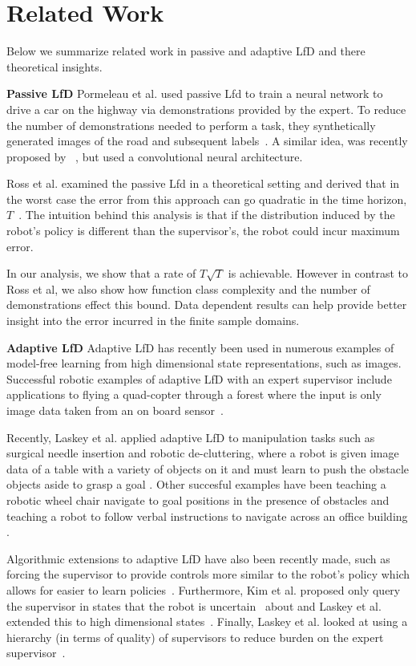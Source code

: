 \documentclass[10pt, conference]{ieeeconf}      %
\begin{document}
\section{Related Work}
Below we summarize related work in passive and adaptive LfD and there theoretical insights. 

\noindent \textbf {Passive LfD}
Pormeleau et al. used passive Lfd to train a neural network to drive a car on the highway via demonstrations provided by the expert. To reduce the number of demonstrations needed to perform a task, they synthetically generated  images of the road and subsequent labels~\cite{pomerleau1989alvinn}. A similar idea, was recently proposed by ~\cite{NVIDEA}, but used a convolutional neural architecture. 

Ross et al. examined the passive Lfd in a theoretical setting and derived that in the worst case the error from this approach can go quadratic in the time  horizon, $T$~\cite{ross2010efficient}. The intuition behind this analysis is that if the distribution induced by the robot's policy is different than the supervisor's, the robot could incur maximum error. 

In our analysis, we show that a rate of $T\sqrt{T}$ is achievable. However in contrast to Ross et al,  we also show how function class complexity and the number of demonstrations effect this bound. Data dependent results can help provide better insight into the error incurred in the finite sample domains. 

\noindent \textbf{Adaptive LfD}
Adaptive LfD has recently been used in numerous examples of model-free learning from high dimensional state representations, such as images. Successful robotic examples of adaptive LfD with an expert supervisor include applications to flying a quad-copter through a forest where the input is only image data taken from an on board sensor~\cite{ross2013learning}.

 Recently, Laskey et al. applied adaptive LfD to manipulation tasks such as surgical needle insertion \cite{laskeyshiv} and robotic de-cluttering, where a robot is given image data of a table with a variety of objects on it and must learn to push the obstacle objects aside to grasp a goal \cite{laskeyrobot}. Other succesful examples have been teaching a robotic wheel chair navigate to goal positions in the presence of obstacles and teaching a robot to follow verbal instructions to navigate across an office building \cite{kim2013maximum, duvallet2013imitation}. 

Algorithmic extensions to adaptive LfD have also been recently made, such as  forcing the supervisor to provide controls more similar to the robot's policy which allows for easier to learn policies~\cite{he2012imitation}. Furthermore, Kim et al. proposed only query the supervisor in states that the robot is uncertain~\cite{kim2013maximum} about and Laskey et al. extended this to high dimensional states~\cite{laskeyshiv}. Finally, Laskey et al. looked at using a hierarchy (in terms of quality) of supervisors to reduce burden on the expert supervisor~\cite{laskeyrobot}.
\end{document}
